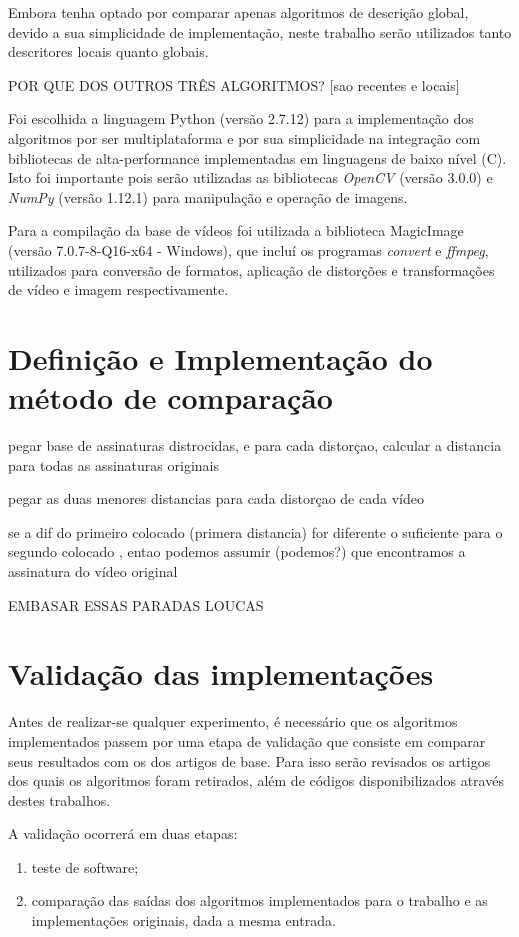 Embora \cite{sylvio2015} tenha optado por comparar apenas algoritmos de descrição global, devido a sua simplicidade de implementação, neste trabalho serão utilizados tanto descritores locais quanto globais.

POR QUE DOS OUTROS TRÊS ALGORITMOS?
[sao recentes e locais]


Foi escolhida a linguagem Python (versão 2.7.12) para a implementação dos algoritmos por ser multiplataforma e  por sua simplicidade na integração com bibliotecas de alta-performance implementadas em linguagens de baixo nível (C). Isto foi importante pois serão utilizadas as bibliotecas \textit{OpenCV} (versão 3.0.0) e \textit{NumPy} (versão 1.12.1) para manipulação e operação de imagens.

Para a compilação da base de vídeos foi utilizada a biblioteca MagicImage (versão 7.0.7-8-Q16-x64 - Windows), que incluí os programas \textit{convert} e \textit{ffmpeg}, utilizados para conversão de formatos, aplicação de distorções e transformações de vídeo e imagem respectivamente.

\section{Definição e Implementação do método de comparação}




pegar base de assinaturas distrocidas, e para cada distorçao, calcular a distancia para todas as assinaturas originais

pegar as duas menores distancias para cada distorçao de cada vídeo

se a dif do primeiro colocado (primera distancia) for diferente o suficiente para o segundo colocado , entao podemos assumir (podemos?) que encontramos a assinatura do vídeo original

EMBASAR ESSAS PARADAS LOUCAS

\section{Validação das implementações}

Antes de realizar-se qualquer experimento, é necessário que os algoritmos implementados passem por uma etapa de validação que consiste em comparar seus resultados com os dos artigos de base. Para isso serão revisados os artigos dos quais os algoritmos foram retirados, além de códigos disponibilizados através destes trabalhos.

A validação ocorrerá em duas etapas:

\begin{enumerate}
\item teste de software;
\item comparação das saídas dos algoritmos implementados para o trabalho e as implementações originais, dada a mesma entrada.
\end{enumerate}

